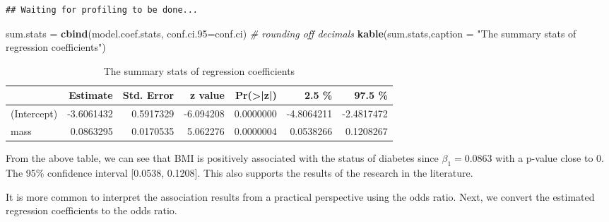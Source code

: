 \documentclass[
]{book}
\newenvironment{Shaded}{\begin{snugshade}}{\end{snugshade}}
\newcommand{\AttributeTok}[1]{\textcolor[rgb]{0.13,0.29,0.53}{#1}}
\newcommand{\CommentTok}[1]{\textcolor[rgb]{0.56,0.35,0.01}{\textit{#1}}}
\newcommand{\FunctionTok}[1]{\textcolor[rgb]{0.13,0.29,0.53}{\textbf{#1}}}
\newcommand{\NormalTok}[1]{#1}
\newcommand{\OtherTok}[1]{\textcolor[rgb]{0.56,0.35,0.01}{#1}}
\newcommand{\SpecialCharTok}[1]{\textcolor[rgb]{0.81,0.36,0.00}{\textbf{#1}}}
\newcommand{\StringTok}[1]{\textcolor[rgb]{0.31,0.60,0.02}{#1}}
\begin{document}
\begin{Shaded}
\end{Shaded}

\begin{verbatim}
## Waiting for profiling to be done...
\end{verbatim}

\begin{Shaded}
\begin{Highlighting}[]
\NormalTok{sum.stats }\OtherTok{=} \FunctionTok{cbind}\NormalTok{(model.coef.stats, }\AttributeTok{conf.ci.95=}\NormalTok{conf.ci)   }\CommentTok{\# rounding off decimals}
\FunctionTok{kable}\NormalTok{(sum.stats,}\AttributeTok{caption =} \StringTok{"The summary stats of regression coefficients"}\NormalTok{)  }
\end{Highlighting}
\end{Shaded}

\begin{table}

\caption{\label{tab:unnamed-chunk-125}The summary stats of regression coefficients}
\centering
\begin{tabular}[t]{l|r|r|r|r|r|r}
\hline
  & Estimate & Std. Error & z value & Pr(>|z|) & 2.5 \% & 97.5 \%\\
\hline
(Intercept) & -3.6061432 & 0.5917329 & -6.094208 & 0.0000000 & -4.8064211 & -2.4817472\\
\hline
mass & 0.0863295 & 0.0170535 & 5.062276 & 0.0000004 & 0.0538266 & 0.1208267\\
\hline
\end{tabular}
\end{table}

From the above table, we can see that BMI is positively associated with the status of diabetes since \(\beta_1 = 0.0863\) with a p-value close to 0. The 95\% confidence interval {[}0.0538, 0.1208{]}. This also supports the results of the research in the literature.

It is more common to interpret the association results from a practical perspective using the odds ratio. Next, we convert the estimated regression coefficients to the odds ratio.
\end{document}
